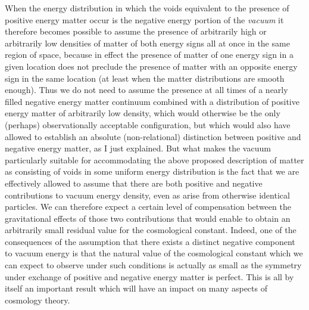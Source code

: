 \documentclass[notitlepage,12pt]{report}
\begin{document}
When the energy distribution in which the voids equivalent to the presence of positive energy matter occur is the negative energy portion of the \textit{vacuum} it therefore becomes possible to assume the presence of arbitrarily high or arbitrarily low densities of matter of both energy signs all at once in the same region of space, because in effect the presence of matter of one energy sign in a given location does not preclude the presence of matter with an opposite energy sign in the same location (at least when the matter distributions are smooth enough). Thus we do not need to assume the presence at all times of a nearly filled negative energy matter continuum combined with a distribution of positive energy matter of arbitrarily low density, which would otherwise be the only (perhaps) observationally acceptable configuration, but which would also have allowed to establish an absolute (non-relational) distinction between positive and negative energy matter, as I just explained. But what makes the vacuum particularly suitable for accommodating the above proposed description of matter as consisting of voids in some uniform energy distribution is the fact that we are effectively allowed to assume that there are both positive and negative contributions to vacuum energy density, even as arise from otherwise identical particles. We can therefore expect a certain level of compensation between the gravitational effects of those two contributions that would enable to obtain an arbitrarily small residual value for the cosmological constant. Indeed, one of the consequences of the assumption that there exists a distinct negative component to vacuum energy is that the natural value of the cosmological constant which we can expect to observe under such conditions is actually as small as the symmetry under exchange of positive and negative energy matter is perfect. This is all by itself an important result which will have an impact on many aspects of cosmology theory.
\end{document}
